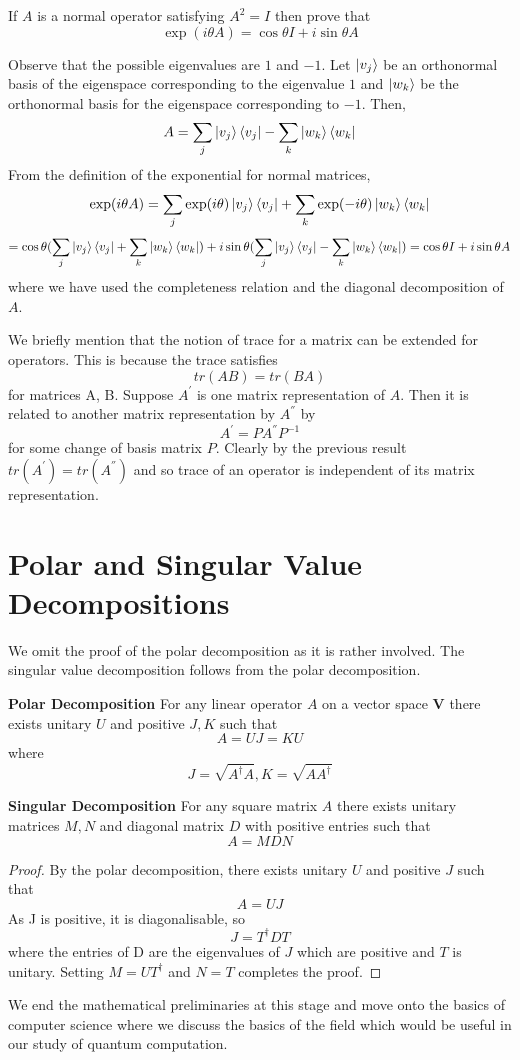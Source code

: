 \begin{exercise}
If $A$ is a normal operator satisfying $A^2 = I$ then prove that 
$$ \exp(i\theta A) = \cos{\theta}I + i\sin{\theta}A$$
\end{exercise}
\begin{solution}
Observe that the possible eigenvalues are $1$ and $-1$. Let $\ket{v_j}$ be an orthonormal basis of the eigenspace corresponding to the eigenvalue $1$ and $\ket{w_k}$ be the orthonormal basis for the eigenspace corresponding to $-1$. Then, 
$$ A = \sum_j \ket{v_j}\bra{v_j} - \sum_k \ket{w_k}\bra{w_k} $$
From the definition of the exponential for normal matrices,
$$\exp(i\theta A) = \sum_j \exp(i\theta )\ket{v_j}\bra{v_j} + \sum_k \exp(-i\theta)\ket{w_k}\bra{w_k}$$ 
$$ = \cos{\theta}(  \sum_j \ket{v_j}\bra{v_j} + \sum_k \ket{w_k}\bra{w_k}) + i\sin{\theta}( \sum_j \ket{v_j}\bra{v_j} - \sum_k \ket{w_k}\bra{w_k}) =  \cos{\theta}I + i\sin{\theta}A $$ where we have used the completeness relation and the diagonal decomposition of $A$.
\end{solution}
We briefly mention that the notion of trace for a matrix can be extended for operators. This is because the trace satisfies
$$ tr(AB) = tr(BA) $$ for matrices A, B.
Suppose $A^{'}$ is one matrix representation of $A$. Then it is related to another matrix representation by $A^{''}$ by 
$$A^{'} = PA^{''}P^{-1}$$ for some change of basis matrix $P$.
Clearly by the previous  result $tr(A^{'}) = tr(A^{''})$ and so trace of an operator is independent of its matrix representation.

\section{Polar and Singular Value Decompositions}
We omit the proof of the polar decomposition as it is rather involved. The singular value decomposition follows from the polar decomposition.
\begin{theorem} \textbf{Polar Decomposition}
For any linear operator $A$ on a vector space $\textbf{V}$ there exists unitary $U$ and positive $J, K$ such that
$$A = UJ = KU$$ where
$$J = \sqrt{A^\dagger A}, K = \sqrt{AA^\dagger}$$
\end{theorem}

\begin{theorem} \textbf{Singular Decomposition}
For any square matrix $A$ there exists unitary matrices $M, N$ and diagonal matrix $D$ with positive entries such that
$$A = MDN $$
\end{theorem}
\begin{proof}
By the polar decomposition, there exists unitary $U$ and positive $J$ such that 
$$ A = UJ $$
As J is positive, it is diagonalisable, so $$J = T^\dagger DT$$ where the entries of D are the eigenvalues of $J$ which are positive and $T$ is unitary.
Setting $M = UT^\dagger$ and $N = T$ completes the proof.
\end{proof}

We end the mathematical preliminaries at this stage and move onto the basics of computer science where we discuss the basics of the field which would be useful in our study of quantum computation.
\clearpage
